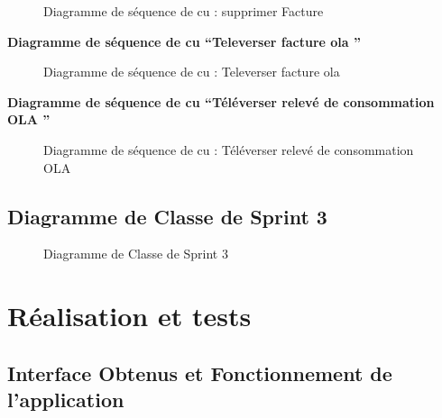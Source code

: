 \documentclass[a4paper,11pt]{report}
\begin{document}
\begin{figure}[H]
  \centering
  \setlength{\fboxrule}{1pt}
  \setlength{\fboxsep}{3pt}
  \caption{ Diagramme de séquence de cu : supprimer Facture 
 }
  \label{fig:clone-result}
\end{figure}


\newpage
\textbf{ Diagramme de séquence de cu “Televerser facture ola ”}

\begin{figure}[H]
  \centering
  \setlength{\fboxrule}{1pt}
  \setlength{\fboxsep}{3pt}
  \caption{ Diagramme de séquence de cu : Televerser facture ola
 }
  \label{fig:clone-result}
\end{figure}


\newpage
\textbf{ Diagramme de séquence de cu “Téléverser relevé de consommation OLA ”}

\begin{figure}[H]
  \centering
  \setlength{\fboxrule}{1pt}
  \setlength{\fboxsep}{3pt}
  \caption{ Diagramme de séquence de cu : Téléverser relevé de consommation OLA
 }
  \label{fig:clone-result}
\end{figure}


\subsection{Diagramme de Classe de Sprint 3}



\begin{figure}[H]
  \centering
  \setlength{\fboxrule}{1pt}
  \setlength{\fboxsep}{3pt}
  \caption{ Diagramme de Classe de Sprint 3
 }
  \label{fig:clone-result}
\end{figure}


\newpage
\section{Réalisation et tests }
\subsection{Interface Obtenus et Fonctionnement de l'application}
\end{document}
